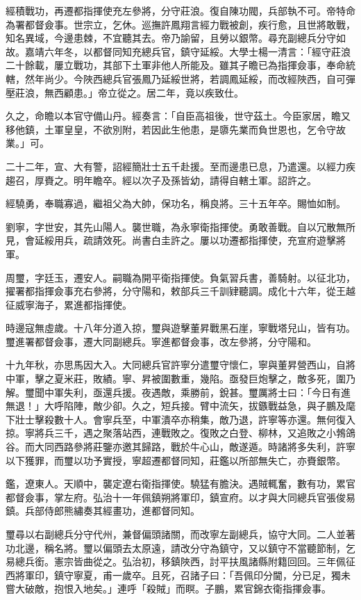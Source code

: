 \begin{pinyinscope}
經積戰功，再遷都指揮使充左參將，分守莊浪。復自陳功閥，兵部執不可。帝特命為署都督僉事。世宗立，乞休。巡撫許鳳翔言經力戰被創，疾行愈，且世將敢戰，知名異域，今邊患棘，不宜聽其去。帝乃諭留，且勞以銀幣。尋充副總兵分守如故。嘉靖六年冬，以都督同知充總兵官，鎮守延綏。大學士楊一清言：「經守莊浪二十餘載，屢立戰功，其部下土軍非他人所能及。雖其子瞻已為指揮僉事，奉命統轄，然年尚少。今陜西總兵官張鳳乃延綏世將，若調鳳延綏，而改經陜西，自可彈壓莊浪，無西顧患。」帝立從之。居二年，竟以疾致仕。

久之，命瞻以本官守備山丹。經奏言：「自臣高祖後，世守茲土。今臣家居，瞻又移他鎮，土軍皇皇，不欲別附，若因此生他患，是隳先業而負世恩也，乞令守故業。」可。

二十二年，宣、大有警，詔經簡壯士五千赴援。至而邊患已息，乃遣還。以經力疾趨召，厚賚之。明年瞻卒。經以次子及孫皆幼，請得自轄土軍。詔許之。

經驍勇，奉職寡過，繼祖父為大帥，保功名，稱良將。三十五年卒。賜恤如制。

劉寧，字世安，其先山陽人。襲世職，為永寧衛指揮使。勇敢善戰。自以冗散無所見，會延綏用兵，疏請效死。尚書白圭許之。屢以功遷都指揮使，充宣府遊擊將軍。

周璽，字廷玉，遷安人。嗣職為開平衛指揮使。負氣習兵書，善騎射。以征北功，擢署都指揮僉事充右參將，分守陽和，敕部兵三千訓肄聽調。成化十六年，從王越征威寧海子，累進都指揮使。

時邊寇無虛歲。十八年分道入掠，璽與遊擊董昇戰黑石崖，寧戰塔兒山，皆有功。璽進署都督僉事，遷大同副總兵。寧進都督僉事，改左參將，分守陽和。

十九年秋，亦思馬因大入。大同總兵官許寧分遣璽守懷仁，寧與董昇營西山，自將中軍，擊之夏米莊，敗績。寧、昇被圍數重，幾陷。亟發巨炮擊之，敵多死，圍乃解。璽聞中軍失利，亟還兵援。夜遇敵，乘勝前，銳甚。璽厲將士曰：「今日有進無退！」大呼陷陣，敵少卻。久之，短兵接。臂中流矢，拔鏃戰益急，與子鵬及麾下壯士擊殺數十人。會寧兵至，中軍潰卒亦稍集，敵乃退，許寧等亦還。無何復入掠。寧將兵三千，遇之聚落站西，連戰敗之。復敗之白登、柳林，又追敗之小鵓鴿谷。而大同西路參將莊鑒亦邀其歸路，戰於牛心山，敵遂遁。時諸將多失利，許寧以下獲罪，而璽以功予實授，寧超遷都督同知，莊鑑以所部無失亡，亦賚銀幣。

鑑，遼東人。天順中，襲定遼右衛指揮使。驍猛有膽決。遇賊輒奮，數有功，累官都督僉事，掌左府。弘治十一年佩鎮朔將軍印，鎮宣府。以才與大同總兵官張俊易鎮。兵部侍郎熊繡奏其經畫功，進都督同知。

璽尋以右副總兵分守代州，兼督偏頭諸關，而改寧左副總兵，協守大同。二人並著功北邊，稱名將。璽以偏頭去太原遠，請改分守為鎮守，又以鎮守不當聽節制，乞易總兵銜。憲宗皆曲從之。弘治初，移鎮陜西，討平扶風諸縣附籍回回。三年佩征西將軍印，鎮守寧夏，甫一歲卒。且死，召諸子曰：「吾佩印分閫，分已足，獨未嘗大破敵，抱恨入地矣。」連呼「殺賊」而瞑。子鵬，累官錦衣衛指揮僉事。


\end{pinyinscope}
